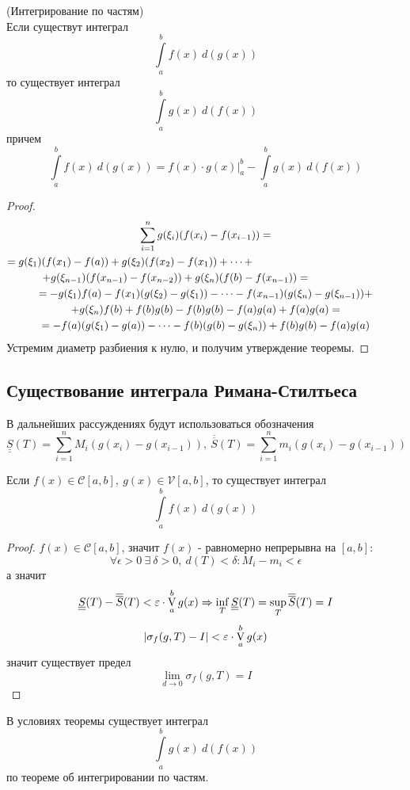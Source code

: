 \begin{numtheorem}
    (Интегрирование по частям)\\
    Если существут интеграл
    \[\int\limits_{a}^{b}f(x)\ d(g(x))\]
    то существует интеграл
    \[\int\limits_{a}^{b}g(x)\ d(f(x))\]
    причем
    \[\int\limits_{a}^{b}f(x)\ d(g(x))=f(x)\cdot g(x)|_a^b - \int\limits_{a}^{b}g(x)\ d(f(x))\]
\end{numtheorem} 
\begin{proof}
    \begin{multline*}
        \sum\limits_{i=1}^{n}g(\xi_i)(f(x_i)-f(x_{i-1}))=\\
        =g(\xi_1)(f(x_1)-f(a))+g(\xi_2)(f(x_2)-f(x_1))+\dots+\tab[5cm]\\
        +g(\xi_{n-1})(f(x_{n-1})-f(x_{n-2}))+g(\xi_{n})(f(b)-f(x_{n-1}))=\tab[2cm]\\
        =-g(\xi_1)f(a)-f(x_1)(g(\xi_2)-g(\xi_1))-\dots-f(x_{n-1})(g(\xi_n)-g(\xi_{n-1}))+\\
        +g(\xi_n)f(b)+f(b)g(b)-f(b)g(b)-f(a)g(a)+f(a)g(a)=\\ %
        =-f(a)(g(\xi_1)-g(a))-\dots-f(b)(g(b)-g(\xi_n))+f(b)g(b)-f(a)g(a)
    \end{multline*}
    Устремим диаметр разбиения к нулю, и получим утверждение теоремы.
\end{proof} 
\subsection{Существование интеграла Римана-Стилтьеса}
В дальнейших рассуждениях будут использоваться обозначения
\[\underline{\underline{S}}(T)=\sum\limits_{i=1}^{n}M_i(g(x_i)-g(x_{i-1})),\ \overline{\overline{S}}(T)=\sum\limits_{i=1}^{n}m_i(g(x_i)-g(x_{i-1}))\] 
\begin{theorem}
    Если $f(x)\in \mathcal{C}[a,b],\ g(x)\in \mathcal{V}[a,b]$, то существует интеграл
    \[\int\limits_{a}^{b}f(x)\ d(g(x))\]
\end{theorem}
\begin{proof}
    $f(x)\in \mathcal{C}[a,b]$, значит $f(x)$ - равномерно непрерывна на $[a,b]$:
    \[\forall \epsilon>0\ \exists\ \delta>0,\ d(T)<\delta: M_i-m_i<\epsilon\]
    а значит
    \[\underline{\underline{S}}(T)-\overline{\overline{S}}(T)<\varepsilon\cdot \operatorname*{V}\limits_{a}^{b}g(x) \Rightarrow \inf\limits_T \underline{\underline{S}}(T)=\sup\limits_T \overline{\overline{S}}(T)=I\]
    \[|\sigma_f(g,T)-I|<\varepsilon\cdot \operatorname*{V}\limits_{a}^{b}g(x)\]
    значит существует предел
    \[\lim\limits_{d\to 0}\sigma_f(g,T)=I\]
\end{proof} 
\begin{comm}
    В условиях теоремы существует интеграл
    \[\int\limits_{a}^{b} g(x)\ d(f(x))\]
    по теореме об интегрировании по частям.
\end{comm} 
